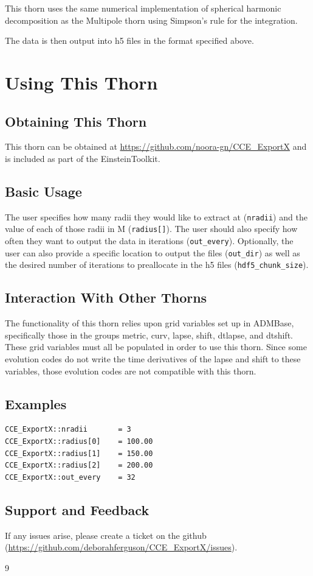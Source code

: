 \documentclass{article}
\begin{document}
This thorn uses the same numerical implementation of spherical harmonic decomposition as the Multipole thorn using 
Simpson’s rule for the integration.

The data is then output into h5 files in the format specified above.

\section{Using This Thorn}

\subsection{Obtaining This Thorn}

This thorn can be obtained at \url{https://github.com/noora-gn/CCE_ExportX} and is included as part of the EinsteinToolkit.

\subsection{Basic Usage}

The user specifies how many radii they would like to extract at (\texttt{nradii}) and the value of each of those radii 
in M (\texttt{radius[]}). The user should also specify how often they want to output the data in iterations (\texttt{out\_every}).
Optionally, the user can also provide a specific location to output the files (\texttt{out\_dir}) as well as the desired 
number of iterations to preallocate in the h5 files (\texttt{hdf5\_chunk\_size}).

\subsection{Interaction With Other Thorns}

The functionality of this thorn relies upon grid variables set up in ADMBase, specifically those in the groups metric, curv, 
lapse, shift, dtlapse, and dtshift. These grid variables must all be populated in order to use this thorn. Since some 
evolution codes do not write the time derivatives of the lapse and shift to these variables, those evolution codes are not 
compatible with this thorn.

\subsection{Examples}

\begin{verbatim}
CCE_ExportX::nradii       = 3
CCE_ExportX::radius[0]    = 100.00
CCE_ExportX::radius[1]    = 150.00
CCE_ExportX::radius[2]    = 200.00
CCE_ExportX::out_every    = 32
\end{verbatim}

\subsection{Support and Feedback}

If any issues arise, please create a ticket on the github (\url{https://github.com/deborahferguson/CCE_ExportX/issues}).


\begin{thebibliography}{9}

\end{thebibliography}

\end{document}

